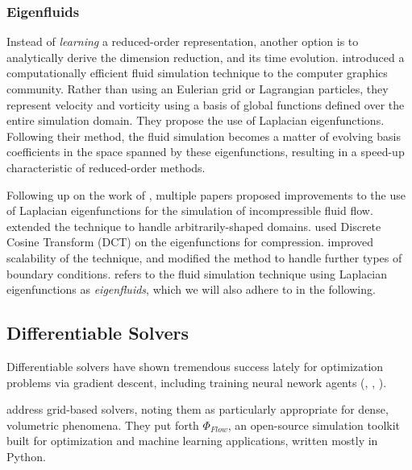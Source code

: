 \subsubsection*{Eigenfluids}
Instead of \textit{learning} a reduced-order representation, another option is to
analytically derive the dimension reduction, and its time evolution.
\cite{dewitt} introduced a computationally efficient fluid simulation technique
to the computer graphics community. Rather than using an Eulerian grid or
Lagrangian particles, they represent velocity and vorticity using a basis of
global functions defined over the entire simulation domain. They propose the use
of Laplacian eigenfunctions. Following their method, the fluid simulation
becomes a matter of evolving basis coefficients in the space spanned by these
eigenfunctions, resulting in a speed-up characteristic of reduced-order methods.

Following up on the work of \cite{dewitt}, multiple papers proposed improvements
to the use of Laplacian eigenfunctions for the simulation of incompressible
fluid flow. \cite{ModelReductionFluidSim} extended the technique to handle
arbitrarily-shaped domains. \cite{EigenfluidCompression} used Discrete Cosine
Transform (DCT) on the eigenfunctions for compression.
\cite{scalable-eigenfluids} improved scalability of the technique, and modified
the method to handle further types of boundary conditions.
\cite{scalable-eigenfluids} refers to the fluid simulation technique using
Laplacian eigenfunctions as \textit{eigenfluids}, which we will also adhere to
in the following.


\subsection{Differentiable Solvers}
Differentiable solvers have shown tremendous success lately for optimization
problems via gradient descent, including training neural nework agents
(\cite{holl2019pdecontrol}, \cite{difftaichi}, \cite{warp2022}).


\cite{holl2019pdecontrol} address grid-based solvers, noting them as
particularly appropriate for dense, volumetric phenomena. They put forth
$\Phi_{Flow}$, an open-source simulation toolkit built for optimization and
machine learning applications, written mostly in Python.

